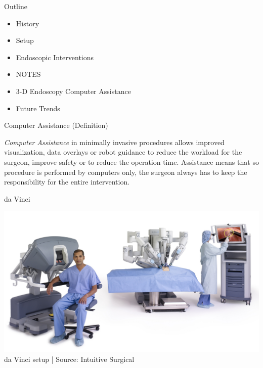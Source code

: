 \begin{frame}{Outline}
	\begin{itemize}
		\item History
		\item Setup
		\item Endoscopic Interventions
		\item NOTES
		\item 3-D Endoscopy
		      \bolditem Computer Assistance
		\item Future Trends
	\end{itemize}
\end{frame}



\begin{frame}{Computer Assistance (Definition)}

	\begin{myDefinition}
		\textit{Computer Assistance} in minimally invasive procedures allows improved visualization, data overlays or robot guidance to reduce the workload for the surgeon, improve safety or to reduce the operation time. Assistance means that so procedure is performed by computers only, the surgeon always has to keep the responsibility for the entire intervention.
	\end{myDefinition}
\end{frame}



\begin{frame}{da Vinci}

	\begin{center}
		\includegraphics[height=.8\textheight ]{images/davinci}\\
		\scriptsize da Vinci setup | Source: Intuitive Surgical
	\end{center}

\end{frame}



